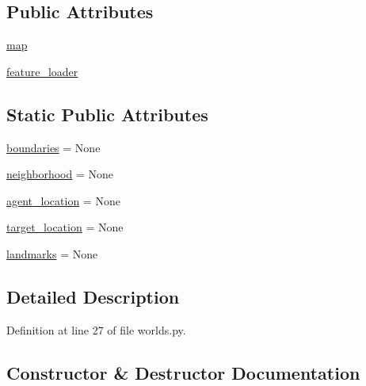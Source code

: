 \subsection*{Public Attributes}
\begin{DoxyCompactItemize}
\item 
\hyperlink{classparlai_1_1tasks_1_1talkthewalk_1_1worlds_1_1Simulator_a2e496f42b19dac1ad35d9604f63dd8e0}{map}
\item 
\hyperlink{classparlai_1_1tasks_1_1talkthewalk_1_1worlds_1_1Simulator_accbc4219f01217f9599c6560e34016fd}{feature\+\_\+loader}
\end{DoxyCompactItemize}
\subsection*{Static Public Attributes}
\begin{DoxyCompactItemize}
\item 
\hyperlink{classparlai_1_1tasks_1_1talkthewalk_1_1worlds_1_1Simulator_afb9280ec4243b403e5b8d7cf694dddd2}{boundaries} = None
\item 
\hyperlink{classparlai_1_1tasks_1_1talkthewalk_1_1worlds_1_1Simulator_a79e2dd5fa3d217ff8e909ef731e38314}{neighborhood} = None
\item 
\hyperlink{classparlai_1_1tasks_1_1talkthewalk_1_1worlds_1_1Simulator_a149433c72afebe5995a02d03133d4507}{agent\+\_\+location} = None
\item 
\hyperlink{classparlai_1_1tasks_1_1talkthewalk_1_1worlds_1_1Simulator_a3d22320d10a2fea9c185be6a0e7bc1fb}{target\+\_\+location} = None
\item 
\hyperlink{classparlai_1_1tasks_1_1talkthewalk_1_1worlds_1_1Simulator_a50902f5af0b1faf0225d13593436b393}{landmarks} = None
\end{DoxyCompactItemize}


\subsection{Detailed Description}


Definition at line 27 of file worlds.\+py.



\subsection{Constructor \& Destructor Documentation}
\mbox{\label{classparlai_1_1tasks_1_1talkthewalk_1_1worlds_1_1Simulator_af0dd9259b1847530dd06e97c004b4992}} 
